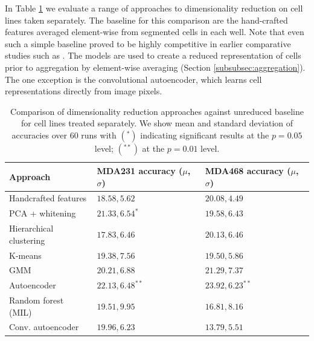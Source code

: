 In Table \ref{table:dim_red} we evaluate a range of approaches to dimensionality reduction on cell lines taken separately. The baseline for this comparison are the hand-crafted features averaged element-wise from segmented cells in each well. Note that even such a simple baseline proved to be highly competitive in earlier comparative studies such as \cite{ljosa2013comparison}. The models are used to create a reduced representation of cells prior to aggregation by element-wise averaging (Section \ref{subsubsec:aggregation}). The one exception is the convolutional autoencoder, which learns cell representations directly from image pixels.


\begin{table}
\begin{tabular}{|l|l|l|}
\hline
Approach & MDA231 accuracy ($\mu$, $\sigma$) & MDA468 accuracy ($\mu$, $\sigma$)\\ \hline
Handcrafted features & $18.58, 5.62$ & $20.08, 4.49$ \\ \hline
PCA + whitening & $21.33, 6.54^*$ & $19.58, 6.43$\\
Hierarchical clustering & $17.83, 6.46$ & $20.13, 6.46$\\
K-means & $19.38, 7.56$ & $19.50, 5.86$\\
GMM & $20.21, 6.88$ & $21.29, 7.37$\\
Autoencoder & $\mathbf{22.13, 6.48}^{**}$ & $\mathbf{23.92, 6.23}^{**}$\\
Random forest (MIL) & $19.51, 9.95$ & $16.81, 8.16$\\
Conv. autoencoder & $19.96, 6.23$ & $13.79, 5.51$\\ \hline
\end{tabular}
\caption{Comparison of dimensionality reduction approaches against unreduced baseline for cell lines treated separately. We show mean and standard deviation of accuracies over 60 runs with $(^*)$ indicating significant results at the $p = 0.05$ level; $(^{**})$ at the $p = 0.01$ level.}
\label{table:dim_red}
\end{table}

